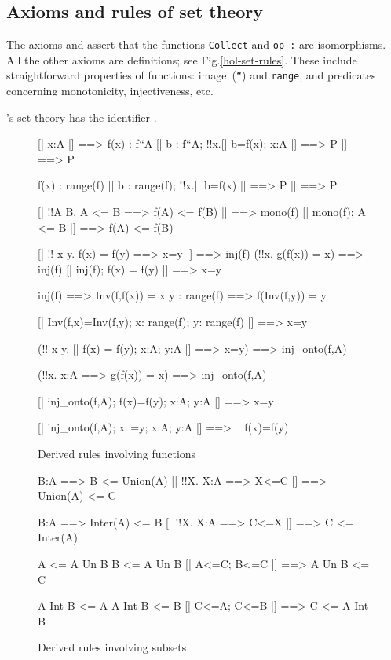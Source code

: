 \subsection{Axioms and rules of set theory}
The axioms  and
 assert that the functions {\tt Collect} and
\hbox{\tt op :} are isomorphisms. 
All the other axioms are definitions; see Fig.\ts \ref{hol-set-rules}.
These include straightforward properties of functions: image~({\tt``}) and
{\tt range}, and predicates concerning monotonicity, injectiveness, etc.

{\HOL}'s set theory has the {\ML} identifier .

\begin{figure} \underscoreon
\begin{ttbox}
     [| x:A |] ==> f(x) : f``A
     [| b : f``A;  !!x.[| b=f(x);  x:A |] ==> P |] ==> P

     f(x) : range(f)
     [| b : range(f);  !!x.[| b=f(x) |] ==> P |] ==> P

      [| !!A B. A <= B ==> f(A) <= f(B) |] ==> mono(f)
      [| mono(f);  A <= B |] ==> f(A) <= f(B)

       [| !! x y. f(x) = f(y) ==> x=y |] ==> inj(f)
              (!!x. g(f(x)) = x) ==> inj(f)
       [| inj(f); f(x) = f(y) |] ==> x=y

    inj(f) ==> Inv(f,f(x)) = x
    y : range(f) ==> f(Inv(f,y)) = y

    [| Inv(f,x)=Inv(f,y); x: range(f);  y: range(f) |] ==> x=y

    (!! x y. [| f(x) = f(y); x:A; y:A |] ==> x=y) ==> inj_onto(f,A)

    (!!x. x:A ==> g(f(x)) = x) ==> inj_onto(f,A)

    [| inj_onto(f,A);  f(x)=f(y);  x:A;  y:A |] ==> x=y

    [| inj_onto(f,A);  x~=y;  x:A;  y:A |] ==> ~ f(x)=f(y)
\end{ttbox}
\caption{Derived rules involving functions} \label{hol-fun}
\end{figure}


\begin{figure} \underscoreon
\begin{ttbox}
     B:A ==> B <= Union(A)
     [| !!X. X:A ==> X<=C |] ==> Union(A) <= C

     B:A ==> Inter(A) <= B
  [| !!X. X:A ==> C<=X |] ==> C <= Inter(A)

       A <= A Un B
       B <= A Un B
        [| A<=C;  B<=C |] ==> A Un B <= C

      A Int B <= A
      A Int B <= B
    [| C<=A;  C<=B |] ==> C <= A Int B
\end{ttbox}
\caption{Derived rules involving subsets} \label{hol-subset}
\end{figure}


